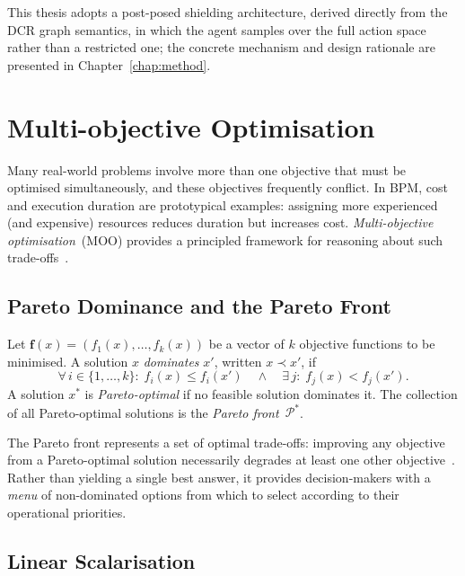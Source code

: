 This thesis adopts a post-posed shielding architecture, derived directly from
the DCR graph semantics, in which the agent samples over the full action
space rather than a restricted one; the concrete mechanism and design
rationale are presented in Chapter~\ref{chap:method}.

\section{Multi-objective Optimisation}
\label{sec:moopt}

Many real-world problems involve more than one objective that must be optimised
simultaneously, and these objectives frequently conflict.  In BPM, cost and
execution duration are prototypical examples: assigning more experienced (and
expensive) resources reduces duration but increases cost.  \emph{Multi-objective
optimisation}~(MOO) provides a principled framework for reasoning about such
trade-offs~\cite{ArtemisDoumeniParetoAgentSimulator}.

\subsection{Pareto Dominance and the Pareto Front}

\begin{definition}
\label{def:pareto}
Let $\mathbf{f}(x) = (f_1(x), \ldots, f_k(x))$ be a vector of $k$ objective
functions to be minimised.  A solution $x$ \emph{dominates} $x'$, written
$x \prec x'$, if
\[
  \forall\, i \in \{1,\ldots,k\}:\; f_i(x) \le f_i(x')
  \quad \wedge \quad
  \exists\, j :\; f_j(x) < f_j(x').
\]
A solution $x^*$ is \emph{Pareto-optimal} if no feasible solution dominates
it.  The collection of all Pareto-optimal solutions is the \emph{Pareto
front}~$\mathcal{P}^*$.
\end{definition}

The Pareto front represents a set of optimal trade-offs: improving any
objective from a Pareto-optimal solution necessarily degrades at least one
other
objective~\cite{ArtemisDoumeniParetoAgentSimulator,KirchdorferLukasFromPolicies}.
Rather than yielding a single best answer, it provides decision-makers with a
\emph{menu} of non-dominated options from which to select according to their
operational priorities.

\subsection{Linear Scalarisation}
\label{sec:lit_scalarisation}

